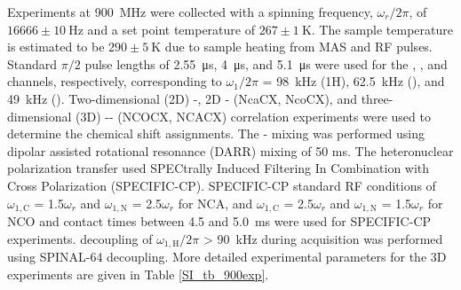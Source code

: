 \documentclass[%
 aip,
 amsmath,amssymb,
 preprint,%
]{revtex4-1}
\begin{document}
Experiments at \SI{900}{\mega\hertz} were collected with a spinning frequency, $\omega_{r}/2\pi$, of $16666\pm\SI{10}{\hertz}$ and a set point temperature of $267\pm\SI{1}{\kelvin}$. The sample temperature is estimated to be $290\pm \SI{5}{\kelvin}$ due to sample heating from MAS and RF pulses.\cite{Zhang2019} Standard $\pi/2$ pulse lengths of \SI{2.55}{\micro\second}, \SI{4}{\micro\second}, and \SI{5.1}{\micro\second} were used for the , , and  channels, respectively, corresponding to $\omega_1/2\pi$ = \SI{98}{\kilo\hertz} (1H), \SI{62.5}{\kilo\hertz} (), and \SI{49}{\kilo\hertz} (). Two-dimensional (2D) -, 2D - (NcaCX, NcoCX), and three-dimensional (3D) -- (NCOCX, NCACX) correlation experiments were used to determine the chemical shift assignments.\cite{Pauli2001,Igumenova2004,Li2007} The - mixing was performed using dipolar assisted rotational resonance (DARR) mixing of 50 ms.\cite{Takegoshi2001} The heteronuclear polarization transfer used SPECtrally Induced Filtering In Combination with Cross Polarization (SPECIFIC-CP).\cite{Baldus1998} SPECIFIC-CP standard RF conditions of $\omega_{1,\text{C}}$ = 1.5$\omega_{r}$ and $\omega_{1,\text{N}}$ = 2.5$\omega_{r}$ for NCA, and $\omega_{1,\text{C}}$ = 2.5$\omega_{r}$ and $\omega_{1,\text{N}}$ = 1.5$\omega_{r}$ for NCO and contact times between 4.5 and \SI{5.0}{\milli\second} were used for SPECIFIC-CP experiments.  decoupling of $\omega_{1,\text{H}}/2\pi$ > \SI{90}{\kilo\hertz} during acquisition was performed using SPINAL-64 decoupling.\cite{Fung2000} More detailed experimental parameters for the 3D experiments are given in Table \ref{SI_tb_900exp}. 
\end{document}
